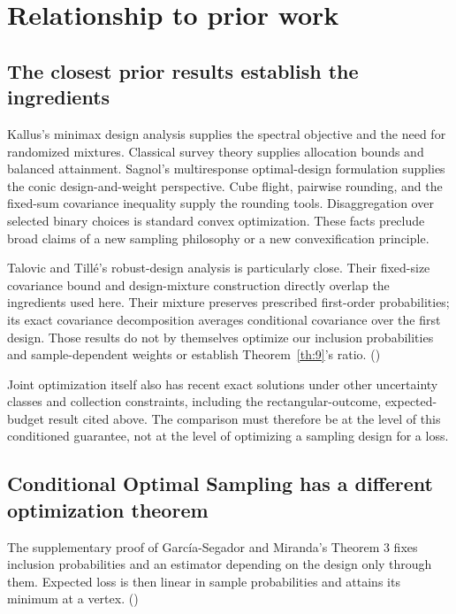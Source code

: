 \documentclass[11pt]{article}
\begin{document}
\section{Relationship to prior
work}\label{relationship-to-prior-work}

\subsection{The closest prior results establish the
ingredients}\label{the-closest-prior-results-establish-the-ingredients}

Kallus's minimax design analysis supplies the spectral objective and the
need for randomized mixtures. Classical survey theory supplies
allocation bounds and balanced attainment. Sagnol's multiresponse
optimal-design formulation supplies the conic design-and-weight
perspective. Cube flight, pairwise rounding, and the fixed-sum
covariance inequality supply the rounding tools. Disaggregation over
selected binary choices is standard convex optimization. These facts
preclude broad claims of a new sampling philosophy or a new
convexification principle.

Talovic and Tillé's robust-design analysis is particularly close. Their
fixed-size covariance bound and design-mixture construction directly
overlap the ingredients used here. Their mixture preserves prescribed
first-order probabilities; its exact covariance decomposition averages
conditional covariance over the first design. Those results do not by
themselves optimize our inclusion probabilities and sample-dependent
weights or establish Theorem~\ref{th:9}'s ratio.
(\citealp[thesis Chapter 2, Corollary 3, Algorithm 1 and Result 11]{TalovicTille2025})

Joint optimization itself also has recent exact solutions under other
uncertainty classes and collection constraints, including the
rectangular-outcome, expected-budget result cited above. The comparison
must therefore be at the level of this conditioned guarantee, not at the
level of optimizing a sampling design for a loss.

\subsection{Conditional Optimal Sampling has a different optimization
theorem}\label{conditional-optimal-sampling-has-a-different-optimization-theorem}

The supplementary proof of García-Segador and Miranda's Theorem 3 fixes
inclusion probabilities and an estimator depending on the design only
through them. Expected loss is then linear in sample probabilities and
attains its minimum at a vertex.
(\citealp[supplementary proof, page 1]{GarciaSegadorMiranda2026})
\end{document}
